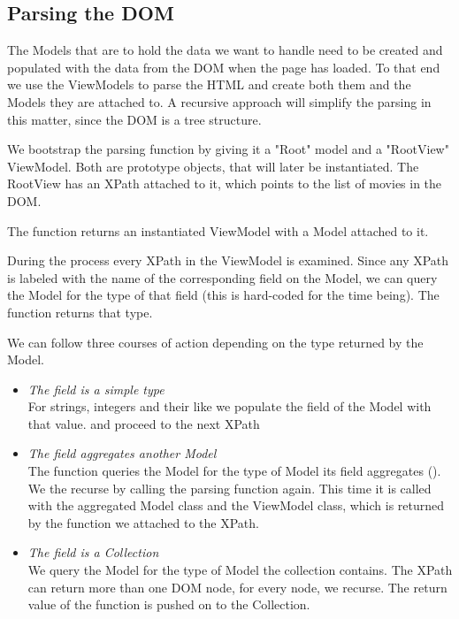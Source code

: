 \subsection{Parsing the DOM}

The Models that are to hold the data we want to handle need to be created and
populated with the data from the DOM when the page has loaded.
To that end we use the ViewModels to parse the HTML and create both them and
the Models they are attached to.
A recursive approach will simplify the parsing in this matter, since the DOM
is a tree structure.

We bootstrap the parsing function by giving it a "Root" model and a "RootView"
ViewModel. Both are prototype objects, that will later be instantiated.
The RootView has an XPath attached to it, which points to the list of movies
in the DOM.

The function returns an instantiated ViewModel with a Model attached to it.

During the process every XPath in the ViewModel is examined.
Since any XPath is labeled with the name of the corresponding field on the
Model, we can query the Model for the type of that field
(this is hard-coded for the time being). The function 
returns that type.

We can follow three courses of action depending on the type
returned by the Model.
\begin{itemize}
	\item \emph{The field is a simple type}\\
	For strings, integers and their like we populate the field of the Model
	with that value. and proceed to the next XPath
	\item \emph{The field aggregates another Model}\\
	The function queries the Model for the type of Model its field aggregates
	().
	We the recurse by calling the parsing function again.
	This time it is called with the aggregated Model class and
	the ViewModel class, which is returned by the  function
	we attached to the XPath.
	\item \emph{The field is a Collection}\\
	We query the Model for the type of Model the collection contains.
	The XPath can return more than one DOM node, for every node, we recurse.
	The return value of the function is pushed on to the Collection.
\end{itemize}

